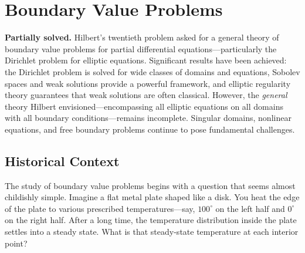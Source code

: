 
\chapter{Boundary Value Problems}
\label{ch:problem-20}

\begin{partiallybox}
\textbf{Partially solved.} Hilbert's twentieth problem asked for a general theory of boundary value problems for partial differential equations---particularly the Dirichlet problem for elliptic equations. Significant results have been achieved: the Dirichlet problem is solved for wide classes of domains and equations, Sobolev spaces and weak solutions provide a powerful framework, and elliptic regularity theory guarantees that weak solutions are often classical. However, the \emph{general} theory Hilbert envisioned---encompassing all elliptic equations on all domains with all boundary conditions---remains incomplete. Singular domains, nonlinear equations, and free boundary problems continue to pose fundamental challenges.
\end{partiallybox}

\section{Historical Context}

The study of boundary value problems begins with a question that seems almost childishly simple. Imagine a flat metal plate shaped like a disk. You heat the edge of the plate to various prescribed temperatures---say, $100^\circ$ on the left half and $0^\circ$ on the right half. After a long time, the temperature distribution inside the plate settles into a steady state. What is that steady-state temperature at each interior point?

